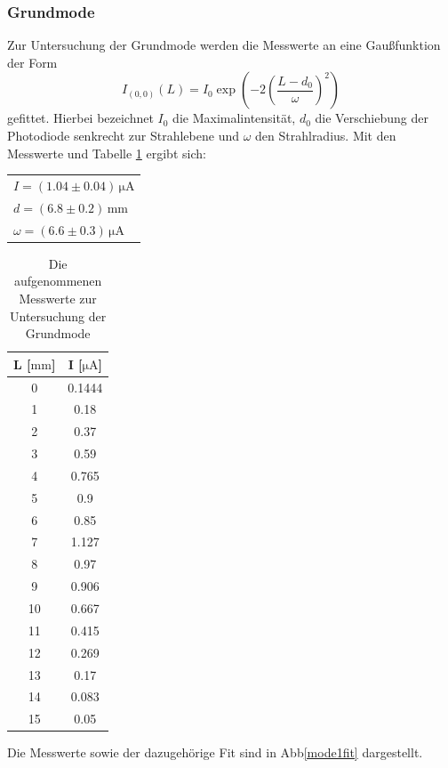 \subsubsection{Grundmode}
Zur Untersuchung der Grundmode werden die Messwerte an eine Gaußfunktion der Form
\begin{equation}
\label{eqn:gauß}
  I_{(0, 0)}(L) = I_0\exp\left(-2\left(\frac{L - d_0}{\omega}\right)^2\right)
\end{equation}
gefittet. Hierbei bezeichnet $I_0$ die Maximalintensität, $d_0$ die Verschiebung der Photodiode senkrecht zur Strahlebene und $\omega$ den Strahlradius.
Mit den Messwerte und Tabelle \ref{mode1} ergibt sich:
\begin{table}[]
  \centering
\begin{tabular}{l}
 $I=(1.04 \pm 0.04)\, \si{\micro\ampere}$\\
 $d=(6.8 \pm 0.2)\, \si{\milli\meter}$   \\
$\omega=(6.6 \pm 0.3)\,  \si{\micro\ampere}$
\end{tabular}
\end{table}
\begin{table}[]
  \centering

\begin{tabular}{c|c}
L [$ \si{\milli\meter}$]   &   I [$ \si{\micro\ampere}$]     \\
\hline
0  & 0.1444 \\
1  & 0.18   \\
2  & 0.37   \\
3  & 0.59   \\
4  & 0.765  \\
5  & 0.9    \\
6  & 0.85   \\
7  & 1.127  \\
8  & 0.97   \\
9  & 0.906  \\
10 & 0.667  \\
11 & 0.415  \\
12 & 0.269  \\
13 & 0.17   \\
14 & 0.083  \\
15 & 0.05
\end{tabular}
\caption{Die aufgenommenen Messwerte zur Untersuchung der Grundmode}
\label{mode1}
\end{table}
Die Messwerte sowie der dazugehörige Fit sind in Abb\ref{mode1fit} dargestellt.
